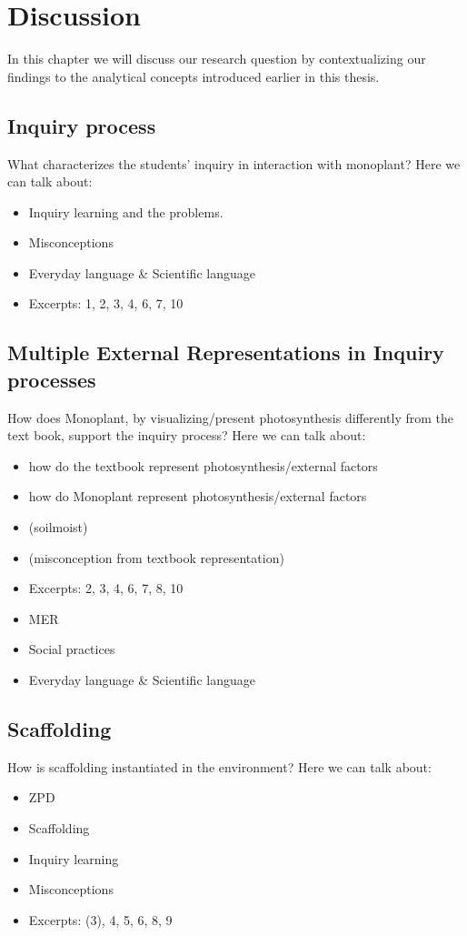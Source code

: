 \chapter{Discussion}
In this chapter we will discuss our research question by contextualizing our findings to the analytical concepts introduced earlier in this thesis. 

\section{Inquiry process}
What characterizes the students’ inquiry in interaction with monoplant?
Here we can talk about: 
\begin{itemize}
\item{Inquiry learning and the problems. \citep{de1998scientific}}
\item{Misconceptions}
\item{Everyday language \& Scientific language}
\item{Excerpts: 1, 2, 3, 4, 6, 7, 10}
\end{itemize}



\section{Multiple External Representations in Inquiry processes}
How does Monoplant, by visualizing/present photosynthesis differently from the text book, support the inquiry process? 
Here we can talk about: 
\begin{itemize}
\item{how do the textbook represent photosynthesis/external factors}
\item{how do Monoplant represent photosynthesis/external factors}
\item{ (soilmoist)}
\item{ (misconception from textbook representation)}
\item{Excerpts: 2, 3, 4, 6, 7, 8, 10}
\item{MER}
\item{Social practices}
\item{Everyday language \& Scientific language}
\end{itemize}




\section{Scaffolding}
How is scaffolding instantiated in the environment?
Here we can talk about: 
\begin{itemize}
\item{ZPD}
\item{Scaffolding}
\item{Inquiry learning}
\item{Misconceptions}
\item{Excerpts: (3), 4, 5, 6, 8, 9}
\end{itemize}



